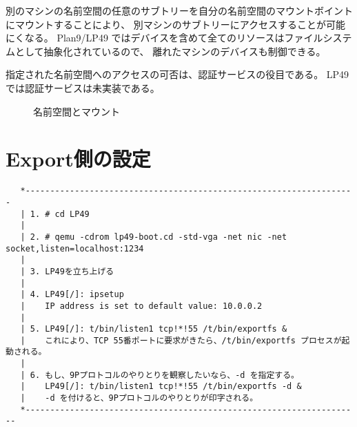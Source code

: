    別のマシンの名前空間の任意のサブトリーを自分の名前空間のマウントボイントにマウントすることにより、 
   別マシンのサブトリーにアクセスすることが可能にくなる。
    Plan9/LP49 ではデバイスを含めて全てのリソースはファイルシステムとして抽象化されているので、
    離れたマシンのデバイスも制御できる。

    指定された名前空間へのアクセスの可否は、認証サービスの役目である。
   LP49 では認証サービスは未実装である。

\begin{comment}
\begin{figure}
\begin{center}
\setlength{\unitlength}{0.6mm}
\begin{picture}(140, 70)
  \put(10,0){\framebox(50, 60)[tc]{LP49: Import side}}
  \put(10,40){\makebox(50, 10)[tc]{Name Space}}
  \put(80,0){\framebox(50, 60)[tc]{LP49: Export side}}
  \put(80,40){\makebox(50, 10)[tc]{Name Space}}
\end{picture}
\end{center}
\caption{名前空間のexport/import}
\end{figure}
\end{comment}
    

\begin{figure}[htb]
  \begin{center}
   \epsfxsize=440pt
    \caption{名前空間とマウント}
    \label{fig:NSmount}
  \end{center}
\end{figure}



\section{Export側の設定}

\begin{verbatim}    
   *-------------------------------------------------------------------
   | 1. # cd LP49                                                                        
   |
   | 2. # qemu -cdrom lp49-boot.cd -std-vga -net nic -net socket,listen=localhost:1234   
   |
   | 3. LP49を立ち上げる
   |
   | 4. LP49[/]: ipsetup                                                                 
   |    IP address is set to default value: 10.0.0.2                                     
   |
   | 5. LP49[/]: t/bin/listen1 tcp!*!55 /t/bin/exportfs &                                
   |    これにより、TCP 55番ポートに要求がきたら、/t/bin/exportfs プロセスが起動される。 
   |
   | 6. もし、9Pプロトコルのやりとりを観察したいなら、-d を指定する。                    
   |    LP49[/]: t/bin/listen1 tcp!*!55 /t/bin/exportfs -d &                             
   |    -d を付けると、9Pプロトコルのやりとりが印字される。                              
   *--------------------------------------------------------------------
\end{verbatim}    
    
